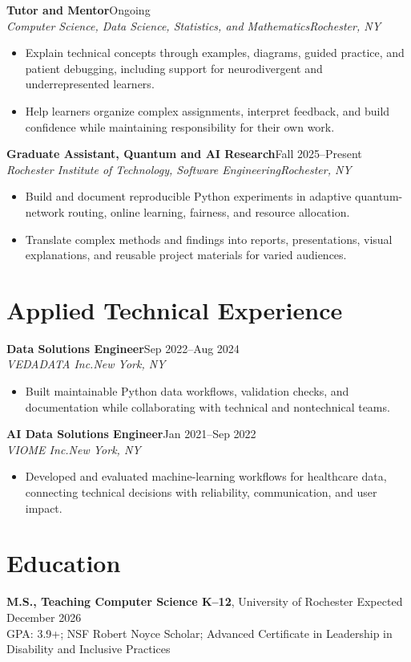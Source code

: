 \documentclass[10pt,letterpaper]{article}
\newcommand{\role}[4]{%
  \textbf{#1}\hfill #2\\
  \textit{#3}\hfill \textit{#4}\vspace{-3pt}
}
\begin{document}
\role{Tutor and Mentor}{Ongoing}
{Computer Science, Data Science, Statistics, and Mathematics}{Rochester, NY}
\begin{itemize}
  \item Explain technical concepts through examples, diagrams, guided practice,
    and patient debugging, including support for neurodivergent and
    underrepresented learners.
  \item Help learners organize complex assignments, interpret feedback, and
    build confidence while maintaining responsibility for their own work.
\end{itemize}

\role{Graduate Assistant, Quantum and AI Research}{Fall 2025--Present}
{Rochester Institute of Technology, Software Engineering}{Rochester, NY}
\begin{itemize}
  \item Build and document reproducible Python experiments in adaptive
    quantum-network routing, online learning, fairness, and resource allocation.
  \item Translate complex methods and findings into reports, presentations,
    visual explanations, and reusable project materials for varied audiences.
\end{itemize}

\section*{Applied Technical Experience}
\role{Data Solutions Engineer}{Sep 2022--Aug 2024}
{VEDADATA Inc.}{New York, NY}
\begin{itemize}
  \item Built maintainable Python data workflows, validation checks, and
    documentation while collaborating with technical and nontechnical teams.
\end{itemize}

\role{AI Data Solutions Engineer}{Jan 2021--Sep 2022}
{VIOME Inc.}{New York, NY}
\begin{itemize}
  \item Developed and evaluated machine-learning workflows for healthcare data,
    connecting technical decisions with reliability, communication, and user
    impact.
\end{itemize}

\section*{Education}
\textbf{M.S., Teaching Computer Science K--12}, University of Rochester
\hfill Expected December 2026\\
GPA: 3.9+; NSF Robert Noyce Scholar; Advanced Certificate in Leadership in
Disability and Inclusive Practices
\end{document}
